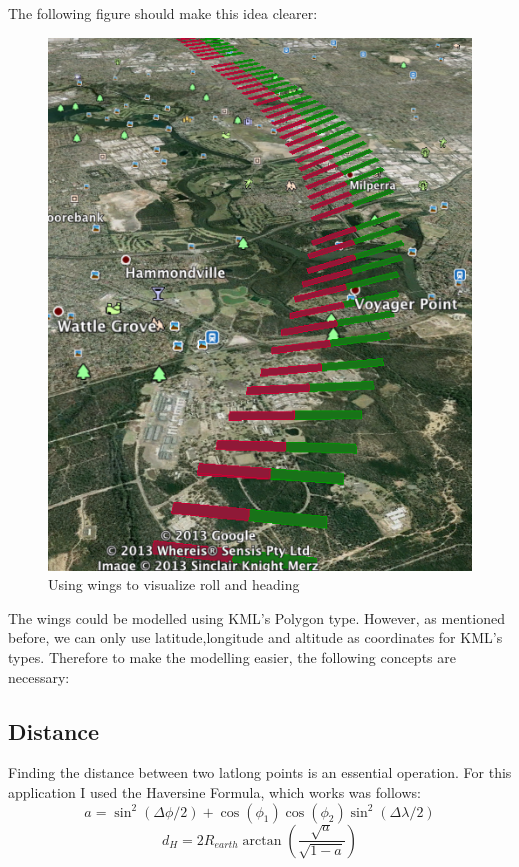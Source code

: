 The following figure should make this idea clearer:\\

\begin{figure}[h]
\caption{Using wings to visualize roll and heading}
\centering
\includegraphics[scale=0.5]{gfx/roll-sample.png}
\end{figure}

The wings could be modelled using KML's Polygon type. However, as mentioned before, we can only use latitude,longitude and altitude as coordinates for KML's types. Therefore to make the modelling easier, the following concepts are necessary:

\subsection{Distance}

Finding the distance between two latlong points is an essential operation. For this application I used the Haversine Formula, which works was follows:
\begin{equation}
  a = \sin^2(\Delta\phi/2) + \cos(\phi_{1}) \cos(\phi_{2})\sin^2(\Delta\lambda/2)
\end{equation}
\begin{equation}
  d_{H} = 2 R_{earth} \arctan(\frac{\sqrt{a}}{\sqrt{1 - a}})
\end{equation}


